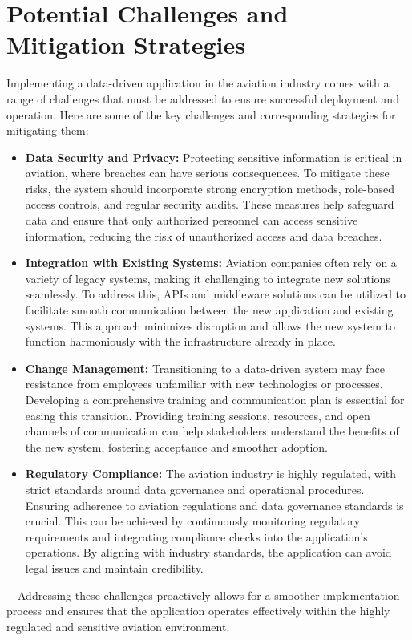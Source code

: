 \documentclass[12pt, a4paper]{article}
\begin{document}
\section{Potential Challenges and Mitigation Strategies}
Implementing a data-driven application in the aviation industry comes with a range of challenges that must be addressed to ensure successful deployment and operation. Here are some of the key challenges and corresponding strategies for mitigating them:
\begin{itemize}
    \item \textbf{Data Security and Privacy:} Protecting sensitive information is critical in aviation, where breaches can have serious consequences. To mitigate these risks, the system should incorporate strong encryption methods, role-based access controls, and regular security audits. These measures help safeguard data and ensure that only authorized personnel can access sensitive information, reducing the risk of unauthorized access and data breaches.
    \item \textbf{Integration with Existing Systems:} Aviation companies often rely on a variety of legacy systems, making it challenging to integrate new solutions seamlessly. To address this, APIs and middleware solutions can be utilized to facilitate smooth communication between the new application and existing systems. This approach minimizes disruption and allows the new system to function harmoniously with the infrastructure already in place.
    \item \textbf{Change Management:} Transitioning to a data-driven system may face resistance from employees unfamiliar with new technologies or processes. Developing a comprehensive training and communication plan is essential for easing this transition. Providing training sessions, resources, and open channels of communication can help stakeholders understand the benefits of the new system, fostering acceptance and smoother adoption.
    \item \textbf{Regulatory Compliance:} The aviation industry is highly regulated, with strict standards around data governance and operational procedures. Ensuring adherence to aviation regulations and data governance standards is crucial. This can be achieved by continuously monitoring regulatory requirements and integrating compliance checks into the application’s operations. By aligning with industry standards, the application can avoid legal issues and maintain credibility.
\end{itemize}
$\quad$Addressing these challenges proactively allows for a smoother implementation process and ensures that the application operates effectively within the highly regulated and sensitive aviation environment.




\end{document}
